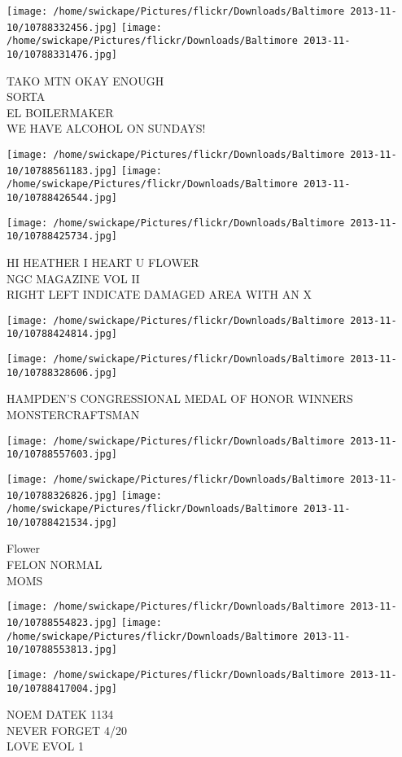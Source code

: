 \documentclass[10pt,letterpaper]{article}
\begin{document}
\texttt{[image: /home/swickape/Pictures/flickr/Downloads/Baltimore 2013-11-10/10788332456.jpg]}
\texttt{[image: /home/swickape/Pictures/flickr/Downloads/Baltimore 2013-11-10/10788331476.jpg]}

TAKO MTN OKAY ENOUGH\\
SORTA\\
EL BOILERMAKER\\
WE HAVE ALCOHOL ON SUNDAYS!
\pagebreak

\texttt{[image: /home/swickape/Pictures/flickr/Downloads/Baltimore 2013-11-10/10788561183.jpg]}
\texttt{[image: /home/swickape/Pictures/flickr/Downloads/Baltimore 2013-11-10/10788426544.jpg]}

\vspace{0.25in}
\texttt{[image: /home/swickape/Pictures/flickr/Downloads/Baltimore 2013-11-10/10788425734.jpg]}

HI HEATHER I HEART U FLOWER\\
NGC MAGAZINE VOL II\\
RIGHT LEFT INDICATE DAMAGED AREA WITH AN X
\pagebreak

\texttt{[image: /home/swickape/Pictures/flickr/Downloads/Baltimore 2013-11-10/10788424814.jpg]}

\vspace{0.25in}
\texttt{[image: /home/swickape/Pictures/flickr/Downloads/Baltimore 2013-11-10/10788328606.jpg]}

HAMPDEN'S CONGRESSIONAL MEDAL OF HONOR WINNERS\\
MONSTERCRAFTSMAN
\pagebreak

\texttt{[image: /home/swickape/Pictures/flickr/Downloads/Baltimore 2013-11-10/10788557603.jpg]}

\vspace{0.25in}
\texttt{[image: /home/swickape/Pictures/flickr/Downloads/Baltimore 2013-11-10/10788326826.jpg]}
\texttt{[image: /home/swickape/Pictures/flickr/Downloads/Baltimore 2013-11-10/10788421534.jpg]}

Flower\\
FELON NORMAL\\
MOMS
\pagebreak

\texttt{[image: /home/swickape/Pictures/flickr/Downloads/Baltimore 2013-11-10/10788554823.jpg]}
\texttt{[image: /home/swickape/Pictures/flickr/Downloads/Baltimore 2013-11-10/10788553813.jpg]}

\texttt{[image: /home/swickape/Pictures/flickr/Downloads/Baltimore 2013-11-10/10788417004.jpg]}

NOEM DATEK 1134\\
NEVER FORGET 4/20\\
LOVE EVOL 1
\pagebreak
\end{document}
